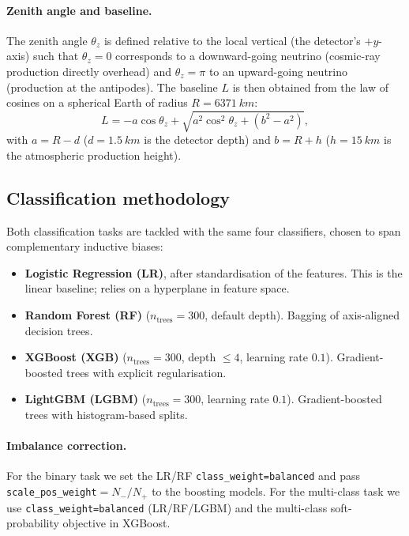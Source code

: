 \documentclass[11pt,a4paper]{article}
\begin{document}
\paragraph{Zenith angle and baseline.}
The zenith angle $\theta_z$ is defined relative to the local vertical (the detector's $+y$-axis) such that $\theta_z=0$ corresponds to a downward-going neutrino (cosmic-ray production directly overhead) and $\theta_z=\pi$ to an upward-going neutrino (production at the antipodes).  The baseline $L$ is then obtained from the law of cosines on a spherical Earth of radius $R=\SI{6371}{km}$:
\begin{equation}
L = -a\cos\theta_z + \sqrt{a^2\cos^2\theta_z + (b^2 - a^2)},
\label{eq:L}
\end{equation}
with $a=R-d$ ($d=\SI{1.5}{km}$ is the detector depth) and $b=R+h$ ($h=\SI{15}{km}$ is the atmospheric production height).

\subsection{Classification methodology}
Both classification tasks are tackled with the same four classifiers, chosen to span complementary inductive biases:

\begin{itemize}[leftmargin=*]
\item \textbf{Logistic Regression (LR)}, after standardisation of the features.  This is the linear baseline; relies on a hyperplane in feature space.
\item \textbf{Random Forest (RF)} ($n_{\text{trees}}=300$, default depth).  Bagging of axis-aligned decision trees.
\item \textbf{XGBoost (XGB)} ($n_{\text{trees}}=300$, depth $\le 4$, learning rate $0.1$).  Gradient-boosted trees with explicit regularisation.
\item \textbf{LightGBM (LGBM)} ($n_{\text{trees}}=300$, learning rate $0.1$).  Gradient-boosted trees with histogram-based splits.
\end{itemize}

\paragraph{Imbalance correction.}
For the binary task we set the LR/RF \texttt{class\_weight=balanced} and pass \texttt{scale\_pos\_weight}$=N_-/N_+$ to the boosting models.  For the multi-class task we use \texttt{class\_weight=balanced} (LR/RF/LGBM) and the multi-class soft-probability objective in XGBoost.
\end{document}
